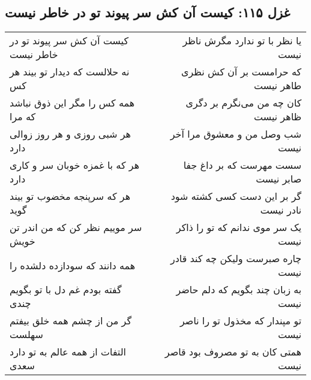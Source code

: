 \begin{center}
\section*{غزل ۱۱۵: کیست آن کش سر پیوند تو در خاطر نیست}
\label{sec:115}
\begin{longtable}{l p{0.5cm} r}
کیست آن کش سر پیوند تو در خاطر نیست
&&
یا نظر با تو ندارد مگرش ناظر نیست
\\
نه حلالست که دیدار تو بیند هر کس
&&
که حرامست بر آن کش نظری طاهر نیست
\\
همه کس را مگر این ذوق نباشد که مرا
&&
کان چه من می‌نگرم بر دگری ظاهر نیست
\\
هر شبی روزی و هر روز زوالی دارد
&&
شب وصل من و معشوق مرا آخر نیست
\\
هر که با غمزه خوبان سر و کاری دارد
&&
سست مهرست که بر داغ جفا صابر نیست
\\
هر که سرپنجه مخضوب تو بیند گوید
&&
گر بر این دست کسی کشته شود نادر نیست
\\
سر موییم نظر کن که من اندر تن خویش
&&
یک سر موی ندانم که تو را ذاکر نیست
\\
همه دانند که سودازده دلشده را
&&
چاره صبرست ولیکن چه کند قادر نیست
\\
گفته بودم غم دل با تو بگویم چندی
&&
به زبان چند بگویم که دلم حاضر نیست
\\
گر من از چشم همه خلق بیفتم سهلست
&&
تو مپندار که مخذول تو را ناصر نیست
\\
التفات از همه عالم به تو دارد سعدی
&&
همتی کان به تو مصروف بود قاصر نیست
\\
\end{longtable}
\end{center}
